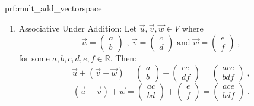 \begin{prf}{prf:mult_add_vectorspace}
\begin{enumerate}
\item Associative Under Addition: Let $\vec{u}, \vec{v}, \vec{w} \in V$ where $$ \vec{u} = \begin{pmatrix}
a \\
b
\end{pmatrix} \text{ , } \vec{v} = \begin{pmatrix}
c \\
d
\end{pmatrix} \text{ and } \vec{w} = \begin{pmatrix}
e \\
f
\end{pmatrix}\;,$$
for some $a,b,c,d,e,f \in \mathbb{R}.$ Then:
$$\vec{u} + \left(\vec{v}+\vec{w}\right) = \begin{pmatrix}
a \\
b
\end{pmatrix} + \begin{pmatrix}
ce \\
df
\end{pmatrix} = \begin{pmatrix}
ace \\
bdf
\end{pmatrix}\;,$$
$$\left(\vec{u} + \vec{v}\right)+\vec{w} = \begin{pmatrix}
ac \\
bd
\end{pmatrix} + \begin{pmatrix}
e \\
f
\end{pmatrix} = \begin{pmatrix}
ace \\
bdf
\end{pmatrix}\;.$$


\end{enumerate}
\end{prf}

